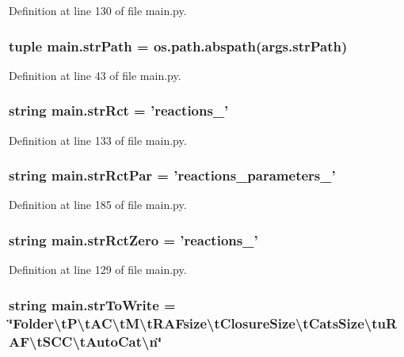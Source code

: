 Definition at line 130 of file main.\-py.

\hypertarget{a00122_ac0b5b603b5f89c10838ce6a42be8c6f7}{
\subsubsection[{str\-Path}]{\setlength{\rightskip}{0pt plus 5cm}tuple main.\-str\-Path = os.\-path.\-abspath(args.\-str\-Path)}}\label{a00122_ac0b5b603b5f89c10838ce6a42be8c6f7}


Definition at line 43 of file main.\-py.

\hypertarget{a00122_a28a37e653a4c0984df32f8d83c3596ff}{
\subsubsection[{str\-Rct}]{\setlength{\rightskip}{0pt plus 5cm}string main.\-str\-Rct = 'reactions\-\_\-'}}\label{a00122_a28a37e653a4c0984df32f8d83c3596ff}


Definition at line 133 of file main.\-py.

\hypertarget{a00122_af48af84bff2351a55727aba6a63c1b52}{
\subsubsection[{str\-Rct\-Par}]{\setlength{\rightskip}{0pt plus 5cm}string main.\-str\-Rct\-Par = 'reactions\-\_\-parameters\-\_\-'}}\label{a00122_af48af84bff2351a55727aba6a63c1b52}


Definition at line 185 of file main.\-py.

\hypertarget{a00122_adbfa32333003aa707723362b43bc11ff}{
\subsubsection[{str\-Rct\-Zero}]{\setlength{\rightskip}{0pt plus 5cm}string main.\-str\-Rct\-Zero = 'reactions\-\_\-'}}\label{a00122_adbfa32333003aa707723362b43bc11ff}


Definition at line 129 of file main.\-py.

\hypertarget{a00122_ab9980383a541b03ce91d6b812a4bf79a}{
\subsubsection[{str\-To\-Write}]{\setlength{\rightskip}{0pt plus 5cm}string main.\-str\-To\-Write = \char`\"{}Folder\textbackslash{}t\-P\textbackslash{}t\-A\-C\textbackslash{}t\-M\textbackslash{}t\-R\-A\-Fsize\textbackslash{}t\-Closure\-Size\textbackslash{}t\-Cats\-Size\textbackslash{}tu\-R\-A\-F\textbackslash{}t\-S\-C\-C\textbackslash{}t\-Auto\-Cat\textbackslash{}n\char`\"{}}}\label{a00122_ab9980383a541b03ce91d6b812a4bf79a}


